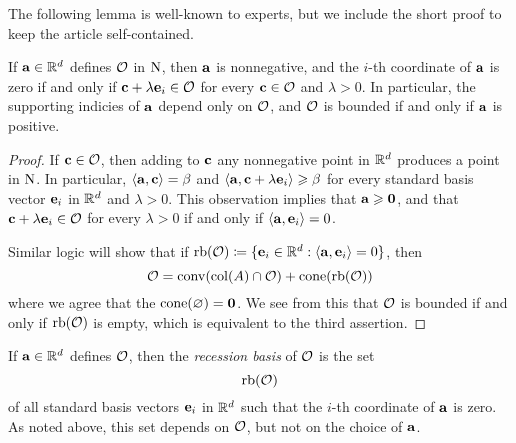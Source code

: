 \documentclass[11pt]{amsart}
\renewcommand{\!}[1]{{\color{red}\text{$\star$\,}#1\,$\star$}}
\begin{document}
The following lemma is well-known to experts, but we include the short proof to keep the article self-contained.

\begin{lemma} 
\label{face: L}
If $\mathbf{a} \in \mathbb{R}^d$ defines $\mathcal{O}$ in $\mathrm{N}$, then $\mathbf{a}$ is nonnegative, and the $i$-th coordinate of $\mathbf{a}$ is zero if and only if $\mathbf{c} + \lambda \mathbf{e}_i \in \mathcal{O}$  for every $\mathbf{c} \in \mathcal{O}$ and $\lambda > 0$.  In particular, the supporting indicies of $\mathbf{a}$ depend only on $\mathcal{O}$, and $\mathcal{O}$ is bounded if and only if $\mathbf{a}$ is positive. 
\end{lemma}

\begin{proof}  If $\mathbf{c} \in \mathcal{O}$, then adding to $\mathbf{c}$ any nonnegative point in $\mathbb{R}^d$ produces a point in $\mathrm{N}$.  In particular, $\langle \mathbf{a}, \mathbf{c} \rangle = \beta$ and $\langle \mathbf{a}, \mathbf{c} + \lambda \mathbf{e}_i \rangle \geqslant \beta$ for every standard basis vector $\mathbf{e}_i$ in $\mathbb{R}^d$ and $\lambda > 0$.  This observation implies that $\mathbf{a} \geqslant \mathbf{0}$, and that $\mathbf{c} + \lambda \mathbf{e}_i \in \mathcal{O}$ for every $\lambda > 0$ if and only if $\langle \mathbf{a}, \mathbf{e}_i \rangle = 0$.  

Similar logic will show that if $\operatorname{rb}(\mathcal{O}) \coloneqq  \{ \mathbf{e}_i \in \mathbb{R}^d : \langle \mathbf{a}, \mathbf{e}_i \rangle = 0\}$, then 
\begin{equation}
\label{face: e}
\mathcal{O} =  \operatorname{conv}( \operatorname{col}(A) \cap \mathcal{O} ) + \operatorname{cone}(\operatorname{rb}(\mathcal{O}))
\end{equation}
where we agree that the $\operatorname{cone}(\varnothing) = \mathbf{0}$.  We see from this that $\mathcal{O}$ is bounded if and only if $\operatorname{rb}(\mathcal{O})$ is empty, which is equivalent to the third assertion.  
\end{proof}

\begin{definition} If $\mathbf{a} \in \mathbb{R}^d$ defines $\mathcal{O}$, then the \emph{recession basis} of $\mathcal{O}$ is the set \[ \operatorname{rb}(\mathcal{O}) \] of all standard basis vectors $\mathbf{e}_i$ in $\mathbb{R}^d$ such that the $i$-th coordinate of $\mathbf{a}$ is zero.  As noted above, this set depends on $\mathcal{O}$, but not on the choice of $\mathbf{a}$.
\end{definition}

\end{document}
